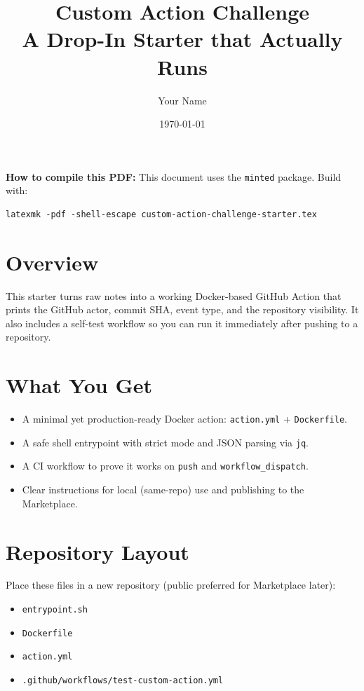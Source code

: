 \documentclass[11pt]{article}
\title{\textbf{Custom Action Challenge}\\A Drop-In Starter that Actually Runs}
\author{Your Name}
\date{\today}
\begin{document}
\maketitle

\begin{tcolorbox}
\textbf{How to compile this PDF:} This document uses the \texttt{minted} package. Build with:
\begin{verbatim}
latexmk -pdf -shell-escape custom-action-challenge-starter.tex
\end{verbatim}
\end{tcolorbox}

\section*{Overview}
This starter turns raw notes into a working Docker-based GitHub Action that prints the
GitHub actor, commit SHA, event type, and the repository visibility. It also includes a
self-test workflow so you can run it immediately after pushing to a repository.

\section*{What You Get}
\begin{itemize}
  \item A minimal yet production-ready Docker action: \texttt{action.yml} + \texttt{Dockerfile}.
  \item A safe shell entrypoint with strict mode and JSON parsing via \texttt{jq}.
  \item A CI workflow to prove it works on \texttt{push} and \texttt{workflow\_dispatch}.
  \item Clear instructions for local (same-repo) use and publishing to the Marketplace.
\end{itemize}

\section*{Repository Layout}
Place these files in a new repository (public preferred for Marketplace later):
\begin{itemize}
  \item \texttt{entrypoint.sh}
  \item \texttt{Dockerfile}
  \item \texttt{action.yml}
  \item \texttt{.github/workflows/test-custom-action.yml}
\end{itemize}
\clearpage
\end{document}
